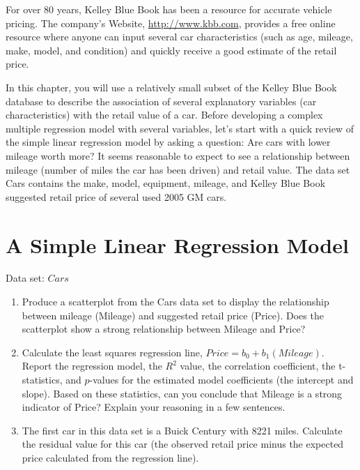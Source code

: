 \documentclass[
]{report}
\begin{document}
For over 80 years, Kelley Blue Book has been a resource for accurate vehicle pricing. The company's Website, \url{http://www.kbb.com}, provides a free online resource where anyone can input several car characteristics (such as age, mileage, make, model, and condition) and quickly receive a good estimate of the retail price.

In this chapter, you will use a relatively small subset of the Kelley Blue Book database to describe the association of several explanatory variables (car characteristics) with the retail value of a car. Before developing a complex multiple regression model with several variables, let's start with a quick review of the simple linear regression model by asking a question: Are cars with lower mileage worth more? It seems reasonable
to expect to see a relationship between mileage (number of miles the car has been driven) and retail value. The data set Cars contains the make, model, equipment, mileage, and Kelley Blue Book suggested retail price of several used 2005 GM cars.

\hypertarget{a-simple-linear-regression-model}{%
\section*{A Simple Linear Regression Model}\label{a-simple-linear-regression-model}}

Data set: \(Cars\)

\begin{enumerate}
\def\labelenumi{\arabic{enumi}.}
\item
  Produce a scatterplot from the Cars data set to display the relationship between mileage (Mileage) and suggested retail price (Price). Does the scatterplot show a strong relationship between Mileage and Price?
\item
  Calculate the least squares regression line, \(Price = b_0 + b_1(Mileage)\). Report the regression model, the \(R^2\) value, the correlation coefficient, the t-statistics, and \(p\)-values for the estimated model coefficients (the intercept and slope). Based on these statistics, can you conclude that Mileage is a strong indicator of Price? Explain your reasoning in a few sentences.
\item
  The first car in this data set is a Buick Century with 8221 miles. Calculate the residual value for this car (the observed retail price minus the expected price calculated from the regression line).
\end{enumerate}
\end{document}
